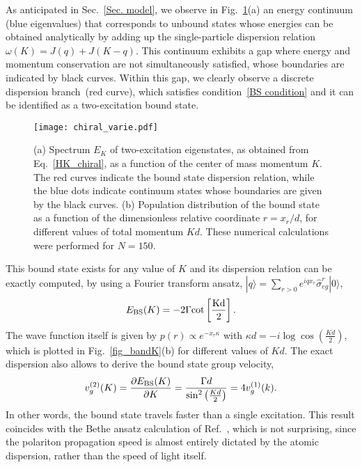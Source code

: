 \documentclass[pra,twocolumn,showpacs,preprintnumbers,amsmath,amssymb]{revtex4-1}
\begin{document}
As anticipated in Sec.~\ref{Sec. model}, we observe in Fig.~\ref{fig:chiral_varie}(a) an energy continuum (blue eigenvalues) that corresponds to unbound states whose  energies can be obtained analytically by adding up the single-particle dispersion relation $\omega(K)=J(q)+J(K-q)$. 
 This continuum exhibits a gap where energy and momentum conservation are not simultaneously satisfied, whose boundaries are indicated by black curves.
Within this gap, we clearly observe a discrete dispersion branch~(red curve),  which  satisfies condition~\eqref{BS condition} and it can be identified as a two-excitation bound state.
\begin{figure}
\centering
\texttt{[image: chiral\_varie.pdf]}%
\caption{(a) Spectrum $E_K$ of two-excitation eigenstates, as obtained from Eq.~\eqref{HK_chiral}, as a function of the center of mass momentum $K$. The red curves indicate the bound state dispersion relation, while the blue dots indicate continuum states whose boundaries are given by the black curves. (b) Population distribution of the bound state as a function of the dimensionless relative coordinate $r=x_r/d$, for different values of total momentum $Kd$. These numerical calculations were performed for $N=150$.}
\label{fig:chiral_varie}
\end{figure}
This bound state exists for any value of $K$ and its dispersion relation can be 
exactly computed,  by using a Fourier transform ansatz, $|q\rangle=\sum_{r>0}e^{iqx_r}\hat\sigma^{r}_{eg}|0\rangle$,
\begin{equation}\label{dis_2ex}
E_{\rm BS}(K)=-2\Gamma\rm cot\left[\frac{Kd}{2}\right].
\end{equation}
The wave function itself is given by $p(r)\propto e^{-x_r \kappa}$ with $\kappa d=-i\log{\cos{\left(\frac{Kd}{2}\right)}}$, which is plotted in Fig.~\ref{fig_bandK}(b) for different values  of $Kd$.
The exact dispersion also allows to derive the bound state group velocity, 
\begin{equation}\label{vgchiral}
v^{(2)}_g(K)=\frac{\partial E_{\rm BS}(K)}{\partial K}=\frac{\Gamma d}{\sin^2{\left(\frac{Kd}{2}\right)}}=4v^{(1)}_g(k).
\end{equation}
In other words, the bound state travels faster than a single excitation. This result coincides with the Bethe ansatz calculation of Ref.~\cite{mahmo_calajo}, which is not surprising, since the polariton propagation speed is almost entirely dictated by the atomic dispersion, rather than the speed of light itself.
\end{document}
